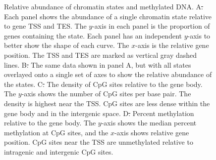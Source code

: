 \documentclass[10pt,letterpaper]{article}
\providecommand{\DIFaddtex}[1]{{\protect\color{blue}\uwave{#1}}} %
\providecommand{\DIFdeltex}[1]{{\protect\color{red}\sout{#1}}}                      %
\providecommand{\DIFaddFL}[1]{\DIFadd{#1}} %
\providecommand{\DIFdelFL}[1]{\DIFdel{#1}} %
\providecommand{\DIFaddbeginFL}{} %
\providecommand{\DIFaddendFL}{} %
\providecommand{\DIFdelbeginFL}{} %
\providecommand{\DIFdelendFL}{} %
\providecommand{\DIFadd}[1]{\texorpdfstring{\DIFaddtex{#1}}{#1}} %
\providecommand{\DIFdel}[1]{\texorpdfstring{\DIFdeltex{#1}}{}} %
\newcommand{\DIFscaledelfig}{0.5}
\newlength{\DIFdelgraphicswidth} %
\newlength{\DIFdelgraphicsheight} %
\newcommand{\DIFaddincludegraphics}[2][]{{\color{blue}\fbox{\DIFOincludegraphics[#1]{#2}}}} %
\newcommand{\DIFdelincludegraphics}[2][]{%
\sbox{\DIFdelgraphicsbox}{\DIFOincludegraphics[#1]{#2}}%
\settoboxwidth{\DIFdelgraphicswidth}{\DIFdelgraphicsbox} %
\settoboxtotalheight{\DIFdelgraphicsheight}{\DIFdelgraphicsbox} %
\scalebox{\DIFscaledelfig}{%
\parbox[b]{\DIFdelgraphicswidth}{\usebox{\DIFdelgraphicsbox}\\[-\baselineskip] \rule{\DIFdelgraphicswidth}{0em}}\llap{\resizebox{\DIFdelgraphicswidth}{\DIFdelgraphicsheight}{%
\setlength{\unitlength}{\DIFdelgraphicswidth}%
\begin{picture}(1,1)%
\thicklines\linethickness{2pt} %
{\color[rgb]{1,0,0}\put(0,0){\framebox(1,1){}}}%
{\color[rgb]{1,0,0}\put(0,0){\line( 1,1){1}}}%
{\color[rgb]{1,0,0}\put(0,1){\line(1,-1){1}}}%
\end{picture}%
}\hspace*{3pt}}} %
} %
\DeclareRobustCommand{\DIFaddbeginFL}{\DIFOaddbeginFL \let\includegraphics\DIFaddincludegraphics} %
\DeclareRobustCommand{\DIFaddendFL}{\DIFOaddendFL \let\includegraphics\DIFOincludegraphics} %
\DeclareRobustCommand{\DIFdelbeginFL}{\DIFOdelbeginFL \let\includegraphics\DIFdelincludegraphics} %
\DeclareRobustCommand{\DIFdelendFL}{\DIFOaddendFL \let\includegraphics\DIFOincludegraphics} %
\begin{document}
\begin{figure}[ht]
\centering
\caption{Relative abundance of chromatin states and methylated DNA. \DIFaddbeginFL \DIFaddFL{(}\DIFaddendFL A\DIFdelbeginFL \DIFdelFL{. }\DIFdelendFL \DIFaddbeginFL \DIFaddFL{) }\DIFaddendFL Each panel 
shows the abundance of a single chromatin state relative to gene TSS and TES. The 
$y$-axis in each panel is the proportion of genes containing the state. Each
panel has an independent $y$-axis to better show the shape of each curve.
The $x$-axis is the relative gene position. The TSS and TES are marked as vertical
gray dashed lines. \DIFaddbeginFL \DIFaddFL{(}\DIFaddendFL B\DIFdelbeginFL \DIFdelFL{. }\DIFdelendFL \DIFaddbeginFL \DIFaddFL{) }\DIFaddendFL The same data shown in panel A, but with all states overlayed
onto a single set of axes to show the relative abundance of the states. 
\DIFaddbeginFL \DIFaddFL{(}\DIFaddendFL C\DIFdelbeginFL \DIFdelFL{. }\DIFdelendFL \DIFaddbeginFL \DIFaddFL{) }\DIFaddendFL The density of CpG sites relative to the gene body. The $y$-axis shows the 
number of CpG sites per base pair. The density is highest near the TSS. 
CpG sites are less dense within the gene body and in the intergenic space. 
\DIFaddbeginFL \DIFaddFL{(}\DIFaddendFL D\DIFdelbeginFL \DIFdelFL{. }\DIFdelendFL \DIFaddbeginFL \DIFaddFL{) }\DIFaddendFL Percent methylation relative to the gene body. The $y$-axis shows the median 
percent methylation at CpG sites, and the $x$-axis shows relative gene position. 
CpG sites near the TSS are unmethylated relative to intragenic and intergenic
CpG sites.}
\label{fig:state_abundance}
\end{figure}
\end{document}
